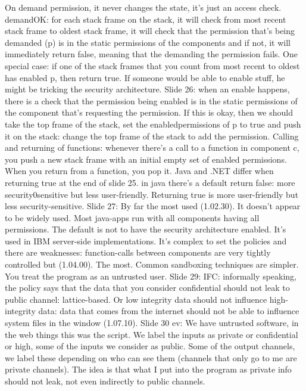 \documentclass[10pt,a4paper]{report}
\begin{document}
On demand permission, it never changes the state, it's just an access check. 
demandOK: for each stack frame on the stack, it will check from most recent stack frame to oldest stack frame, it will check that the permission that's being demanded (p) is in the static permissions of the components and if not, it will immediately return false, meaning that the demanding the permission fails. 
One special case: if one of the stack frames that you count from most recent to oldest has enabled p, then return true.
If someone would be able to enable stuff, he might be tricking the security architecture.
Slide 26: when an enable happens, there is a check that the permission being enabled is in the static permissions of the component that's requesting the permission.  If this is okay, then we should take the top frame of the stack, set the enabledpermissions of p to true and push it on the stack: change the top frame of the stack to add the permission.
Calling and returning of functions: whenever there's a call to a function in component c, you push a new stack frame with an initial empty set of enabled permissions. When you return from a function, you pop it.
Java and .NET differ when returning true at the end of slide 25. in java there's a default return false: more security0sensitive but less user-friendly. Returning true is more user-friendly but less security-sensitive.
Slide 27: By far the most used (1.02.30). It doesn't appear to be widely used. Most java-apps run with all components having all permissions. The default is not to have the security architecture enabled. It's used in IBM server-side implementations. It's complex to set the policies and there are weaknesses: function-calls between components are very tightly controlled but (1.04.00). 
The most. Common sandboxing techniques are simpler. You treat the program as an untrusted user.
Slide 29: IFC: informally speaking, the policy says that the data that you consider confidential should not leak to public channel: lattice-based. Or low integrity data should not influence high-integrity data: data that comes from the internet should not be able to influence system files in the window (1.07.10).
Slide 30 ev: We have untrusted software, in the web things this was the script. We label the inputs as private or confidential or high, some of the inputs we consider as public. Some of the output channels, we label these depending on who can see them (channels that only go to me are private channels). The idea is that what I put into the program as private  info should not leak, not even indirectly to public channels.
\end{document}
